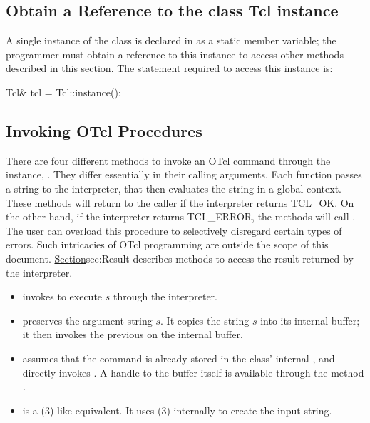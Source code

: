 \subsection{Obtain a Reference to the class Tcl instance}
\label{sec:instance}

A single instance of the class is declared in 
as a static member variable;
the programmer must obtain a reference to this instance
to access other methods described in this section.
The statement required to access this instance is:
\begin{program}
        Tcl& tcl = Tcl::instance();
\end{program}

\subsection{Invoking OTcl Procedures}
\label{sec:Invoke}
There are four different methods to invoke an OTcl command
through the instance, .
They differ essentially in their calling arguments.
Each function passes a string to the interpreter,
that then evaluates the string in a global context.
These methods will return to the caller if the interpreter returns TCL\_OK.
On the other hand, if the interpreter returns TCL\_ERROR,
the methods will call .
The user can overload this procedure to selectively disregard
certain types of errors.
Such intricacies of OTcl programming are outside the
scope of this document.
\href{The next section}{Section}{sec:Result}
describes methods to access the result returned by the interpreter.
\begin{itemize}\itemsep0pt
\item {}
  invokes  to execute $s$ through the interpreter.

\item {}
  preserves the argument string $s$.
  It copies the string $s$ into its internal buffer;
  it then invokes the previous  on the internal buffer.

\item {}
  assumes that the command is already stored in the class' internal
  , and directly invokes .
  A handle to the buffer itself is available through the method
  .

\item
  is a (3) like equivalent.
  It uses (3) internally to create the input string.
\end{itemize}
